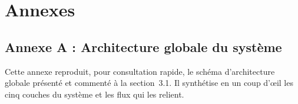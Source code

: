 \documentclass[12pt,a4paper]{report}
\begin{document}
\newpage

\chapter*{Annexes}

\section*{Annexe A : Architecture globale du système}
\begin{onehalfspace}
Cette annexe reproduit, pour consultation rapide, le schéma d'architecture
globale présenté et commenté à la section~3.1. Il synthétise en un coup
d'œil les cinq couches du système et les flux qui les relient.
\end{onehalfspace}
\end{document}
